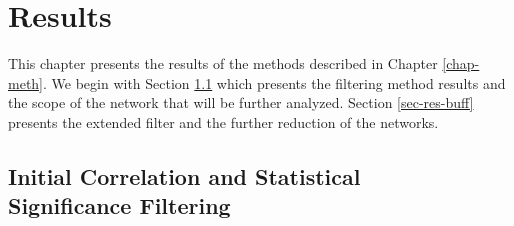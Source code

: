 
\chapter{Results} \label{chap-results}

\bigskip

This chapter presents the results of the methods described in Chapter \ref{chap-meth}. We begin with Section \ref{res-cor-stat} which presents the filtering method results and the scope of the network that will be further analyzed. Section \ref{sec-res-buff} presents the extended filter and the further reduction of the networks.





\section[Initial Correlation and Statistical Significance Filtering]{Initial Correlation and Statistical \\ Significance Filtering}\label{res-cor-stat}


